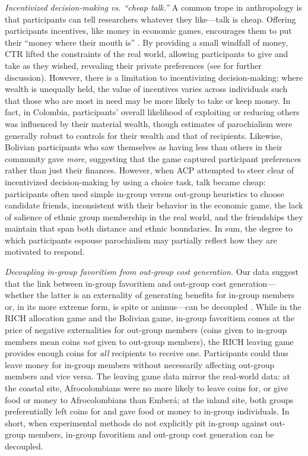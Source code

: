 \documentclass[bibauthoryear]{aa}
\begin{document}
\emph{Incentivized decision-making vs. ``cheap talk.''} A common trope in anthropology is that participants can tell researchers whatever they like---talk is cheap. Offering participants incentives, like money in economic games, encourages them to put their ``money where their mouth is'' \citep{xygalatasreligious, gurven2008collective, Pisor2020}. By providing a small windfall of money, CTR lifted the constraints of the real world, allowing participants to give and take as they wished, revealing their private preferences (see \citet{Pisor2020} for further discussion). However, there is a limitation to incentivizing decision-making: where wealth is unequally held, the value of incentives varies across individuals such that those who are most in need may be more likely to take or keep money. In fact, in Colombia, participants' overall likelihood of exploiting or reducing others was influenced by their material wealth, though estimates of parochialism were generally robust to controls for their wealth and that of recipients. Likewise, Bolivian participants who saw themselves as having less than others in their community gave \emph{more}, suggesting that the game captured participant preferences rather than just their finances. However, when ACP attempted to steer clear of incentivized decision-making by using a choice task, talk became cheap: participants often used simple in-group versus out-group heuristics to choose candidate friends, inconsistent with their behavior in the economic game, the lack of salience of ethnic group membership in the real world, and the friendships they maintain that span both distance and ethnic boundaries. In sum, the degree to which participants espouse parochialism may partially reflect how they are motivated to respond.

\emph{Decoupling in-group favoritism from out-group cost generation.} Our data suggest that the link between in-group favoritism and out-group cost generation---whether the latter is an externality of generating benefits for in-group members or, in its more extreme form, is spite or animus---can be decoupled \citep[see also][]{cashdan2001ethnocentrism, hruschka2013economic, schaub2017threat, yamagishi2016parochial}. While in the RICH allocation game and the Bolivian game, in-group favoritism comes at the price of negative externalities for out-group members (coins given to in-group members mean coins \emph{not} given to out-group members), the RICH leaving game provides enough coins for \emph{all} recipients to receive one. Participants could thus leave money for in-group members without necessarily affecting out-group members and vice versa. The leaving game data mirror the real-world data: at the coastal site, Afrocolombians were no more likely to leave coins for, or give food or money to Afrocolombians than Ember\'a; at the inland site, both groups preferentially left coins for and gave food or money to in-group individuals. In short, when experimental methods do not explicitly pit in-group against out-group members, in-group favoritism and out-group cost generation can be decoupled.
\end{document}

